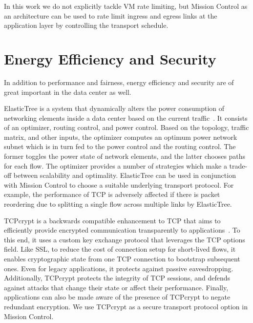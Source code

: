 \documentclass[a4paper,12pt,twoside,openright]{report}
\begin{document}
In this work we do not explicitly tackle VM rate limiting, but Mission Control
as an architecture can be used to rate limit ingress and egress links at the
application layer by controlling the transport schedule.

\section{Energy Efficiency and Security}
In addition to performance and fairness, energy efficiency and security are of
great important in the data center as well. 

ElasticTree is a system that dynamically alters the power consumption of
networking elements inside a data center based on the current
traffic~\cite{Heller:2010:ESE}. It consists of an optimizer, routing control,
and power control. Based on the topology, traffic matrix, and other inputs, the
optimizer computes an optimum power network subnet which is in turn fed to the
power control and the routing control. The former toggles the power state of
network elements, and the latter chooses paths for each flow. The optimizer
provides a number of strategies which make a trade-off between scalability and
optimality. ElasticTree can be used in conjunction with Mission Control to
choose a suitable underlying transport protocol. For example, the performance of
TCP is adversely affected if there is packet reordering due to splitting a
single flow across multiple links by ElasticTree.

TCPcrypt is a backwards compatible enhancement to TCP that aims to efficiently
provide encrypted communication transparently to applications~\cite{bittau:the}.
To this end, it uses a custom key exchange protocol that leverages the TCP
options field. Like SSL, to reduce the cost of connection setup for short-lived
flows, it enables cryptographic state from one TCP connection to bootstrap
subsequent ones. Even for legacy applications, it protects against passive
eavesdropping. Additionally, TCPcrypt protects the integrity of TCP sessions,
and defends against attacks that change their state or affect their performance.
Finally, applications can also be made aware of the presence of TCPcrypt to
negate redundant encryption. We use TCPcrypt as a secure transport protocol
option in Mission Control.
\end{document}
